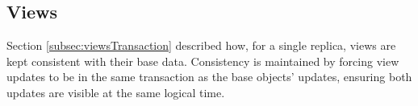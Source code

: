 \documentclass{vldb}
\begin{document}



\subsection{Views}
\label{subsec:repl_views}
Section \ref{subsec:viewsTransaction} described how, for a single replica, views are kept consistent with their base data.
Consistency is maintained by forcing view updates to be in the same transaction as the base objects' updates, ensuring both updates are visible at the same logical time.
\end{document}
